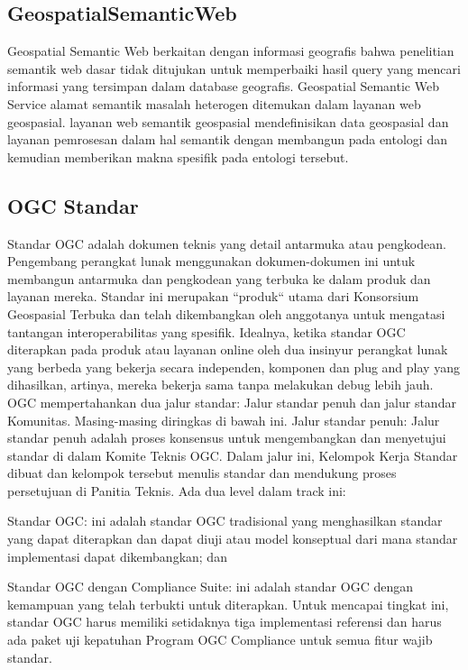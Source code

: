 \begin{enumerize}
\subsection{GeospatialSemanticWeb}
Geospatial Semantic Web berkaitan dengan informasi geografis bahwa penelitian semantik web dasar tidak ditujukan untuk memperbaiki 
hasil query yang mencari informasi yang tersimpan dalam database geografis. Geospatial Semantic Web Service alamat semantik masalah heterogen ditemukan dalam layanan web geospasial. layanan web semantik geospasial mendefinisikan data geospasial dan layanan pemrosesan dalam hal semantik dengan membangun 
pada entologi dan kemudian memberikan makna spesifik pada entologi tersebut. \cite{lupp2008open} 

\subsection{OGC Standar}
Standar OGC adalah dokumen teknis yang detail antarmuka atau pengkodean. Pengembang perangkat lunak menggunakan dokumen-dokumen ini untuk membangun antarmuka dan pengkodean yang terbuka ke dalam produk dan layanan mereka. Standar ini merupakan ``produk`` utama dari Konsorsium Geospasial Terbuka dan telah dikembangkan oleh anggotanya untuk mengatasi tantangan interoperabilitas yang spesifik. Idealnya, ketika standar OGC diterapkan pada produk atau layanan online oleh dua insinyur perangkat lunak yang berbeda yang bekerja secara independen, komponen dan plug and play yang dihasilkan, artinya, mereka bekerja sama tanpa melakukan debug lebih jauh.
OGC mempertahankan dua jalur standar: Jalur standar penuh dan jalur standar Komunitas. Masing-masing diringkas di bawah ini.
Jalur standar penuh: Jalur standar penuh adalah proses konsensus untuk mengembangkan dan menyetujui standar di dalam Komite Teknis OGC. Dalam jalur ini, Kelompok Kerja Standar dibuat dan kelompok tersebut menulis standar dan mendukung proses persetujuan di Panitia Teknis. Ada dua level dalam track ini:
\begin{numerize}
\item	Standar OGC: ini adalah standar OGC tradisional yang menghasilkan standar yang dapat diterapkan dan dapat diuji atau model konseptual dari mana standar implementasi dapat dikembangkan; dan
\item	Standar OGC dengan Compliance Suite: ini adalah standar OGC dengan kemampuan yang telah terbukti untuk diterapkan. Untuk mencapai tingkat ini, standar OGC harus memiliki setidaknya tiga implementasi referensi dan harus ada paket uji kepatuhan Program OGC Compliance untuk semua fitur wajib standar.
\end{numerize}


\end{enumerize}
